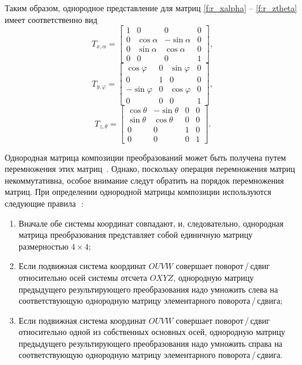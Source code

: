 \documentclass[oneside, final, 14pt]{extarticle}
\begin{document}
Таким образом, однородное представление для матриц \ref{f:r_xalpha} -- \ref{f:r_ztheta} имеет соответственно вид
\begin{equation}\label{f:t_xalpha}
  T_{x,\alpha} = 
  \begin{bmatrix}
  1 & 0 & 0 & 0\\
  0 & \cos{\alpha} & -\sin{\alpha} & 0\\
  0 & \sin{\alpha} & \cos{\alpha} & 0\\
  0 & 0 & 0 & 1
  \end{bmatrix}
  ,
\end{equation}
\begin{equation}\label{f:t_yphi}
  T_{y,\varphi} = 
  \begin{bmatrix}
  \cos{\varphi} & 0 & \sin{\varphi} & 0\\
  0 & 1 & 0 & 0\\
  -\sin{\varphi} & 0 & \cos{\varphi} & 0\\
  0 & 0 & 0 & 1
  \end{bmatrix}
  ,
\end{equation}
\begin{equation}\label{f:t_ztheta}
  T_{z,\theta} = 
  \begin{bmatrix}
  \cos{\theta} & -\sin{\theta} & 0 & 0\\
  \sin{\theta} & \cos{\theta} & 0 & 0\\
  0 & 0 & 1 & 0\\
  0 & 0 & 0 & 1
  \end{bmatrix}
  .
\end{equation}
\par
Однородная матрица композиции преобразований может быть получена путем перемножения этих матриц~\cite{fu:rob_tech}.
Однако, поскольку операция перемножения матриц некоммутативна, особое внимание следут обратить на порядок перемножения матриц.
При определении однородной матрицы композиции используются следующие правила~\cite{fu:rob_tech}\,:
\begin{enumerate}
  \item Вначале обе системы координат совпадают, и, следовательно, однородная матрица преобразования представляет собой единичную матрицу размерностью \(4 \times 4\);
  \item Если подвижная система координат \(OUVW\) совершает поворот\,/\,сдвиг относительно осей системы отсчета \(OXYZ\), однородную матрицу предыдущего результирующего преобразования надо умножить слева на соответствующую однородную матрицу элементарного поворота\,/\,сдвига;
  \item Если подвижная система координат \(OUVW\) совершает поворот\,/\,сдвиг относительно одной из собственных основных осей, однородную матрицу предыдущего результирующего преобразования надо умножить справа на соответствующую однородную матрицу элементарного поворота\,/\,сдвига.
\end{enumerate}
\end{document}

